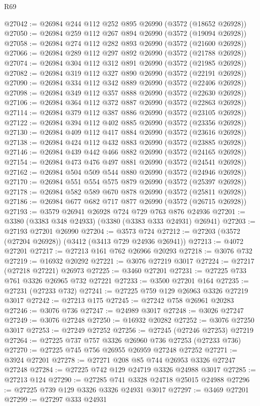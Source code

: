 \begin{lexlean}{R69}
\begin{coremodule}
@27042 := @26984 @244 @112 @252 @895 @26990 (@3572 (@18652 @26928))
@27050 := @26984 @259 @112 @267 @894 @26990 (@3572 (@19094 @26928))
@27058 := @26984 @274 @112 @282 @893 @26990 (@3572 (@21600 @26928))
@27066 := @26984 @289 @112 @297 @892 @26990 (@3572 (@21788 @26928))
@27074 := @26984 @304 @112 @312 @891 @26990 (@3572 (@21985 @26928))
@27082 := @26984 @319 @112 @327 @890 @26990 (@3572 (@22191 @26928))
@27090 := @26984 @334 @112 @342 @889 @26990 (@3572 (@22406 @26928))
@27098 := @26984 @349 @112 @357 @888 @26990 (@3572 (@22630 @26928))
@27106 := @26984 @364 @112 @372 @887 @26990 (@3572 (@22863 @26928))
@27114 := @26984 @379 @112 @387 @886 @26990 (@3572 (@23105 @26928))
@27122 := @26984 @394 @112 @402 @885 @26990 (@3572 (@23356 @26928))
@27130 := @26984 @409 @112 @417 @884 @26990 (@3572 (@23616 @26928))
@27138 := @26984 @424 @112 @432 @883 @26990 (@3572 (@23885 @26928))
@27146 := @26984 @439 @442 @466 @882 @26990 (@3572 (@24165 @26928))
@27154 := @26984 @473 @476 @497 @881 @26990 (@3572 (@24541 @26928))
@27162 := @26984 @504 @509 @544 @880 @26990 (@3572 (@24946 @26928))
@27170 := @26984 @551 @554 @575 @879 @26990 (@3572 (@25397 @26928))
@27178 := @26984 @582 @589 @670 @878 @26990 (@3572 (@25811 @26928))
@27186 := @26984 @677 @682 @717 @877 @26990 (@3572 (@26715 @26928))
@27193 := @3579 @26941 @26928 @724 @729 @763 @876 @24936
@27201 := @3380 (@3383 @348 @24933) (@3380 (@3383 @333 @24931) @26941)
@27203 := @27193 @27201 @26990
@27204 := @3573 @724
@27212 := @27203 (@3572 (@27204 @26928)) (@3412 (@3413 @729 @24936 @26941))
@27213 := @4072 @27201
@27217 := @27213 @161 @762 @26966 @20293
@27218 := @3076 @732
@27219 := @16932 @20292
@27221 := @3076 @27219 @3017
@27224 := @27217 (@27218 @27221) @26973
@27225 := @3460 @27201
@27231 := @27225 @733 @761 @3326 @26965 @732 @27221
@27233 := @3500 @27201 @164
@27235 := @27231 (@27233 @732)
@27241 := @27225 @759 @129 @26963 @3326 @27219 @3017
@27242 := @27213 @175
@27245 := @27242 @758 @26961 @20283
@27246 := @3076 @736
@27247 := @24989 @3017
@27248 := @3026 @27247
@27249 := @3076 @27248
@27250 := @16932 @20282
@27252 := @3076 @27250 @3017
@27253 := @27249 @27252
@27256 := @27245 (@27246 @27253) @27219
@27264 := @27225 @737 @757 @3326 @26960 @736 @27253 (@27233 @736)
@27270 := @27225 @745 @756 @26955 @26959 @27248 @27252
@27271 := @3924 @27201
@27278 := @27271 @208 @85 @744 @26953 @3326 @27247 @27248
@27284 := @27225 @742 @129 @24719 @3326 @24988 @3017
@27285 := @27213 @124
@27290 := @27285 @741 @3328 @24718 @25015 @24988
@27296 := @27225 @739 @129 @3326 @3326 @24931 @3017
@27297 := @3469 @27201
@27299 := @27297 @333 @24931

\end{coremodule}
\end{lexlean}
